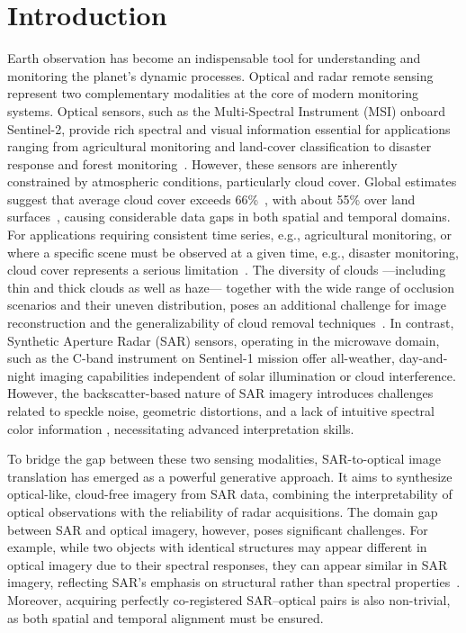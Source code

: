 \documentclass[remotesensing,article,submit,pdftex,moreauthors]{Definitions/mdpi}
\begin{document}
\section{Introduction}
Earth observation has become an indispensable tool for understanding and monitoring the planet's dynamic processes. Optical and radar remote sensing represent two complementary modalities at the core of modern monitoring systems. Optical sensors, such as the Multi-Spectral Instrument (MSI) onboard Sentinel-2, provide rich spectral and visual information essential for applications ranging from agricultural monitoring and land-cover classification to disaster response and forest monitoring~\cite{S2MS_GAN}. However, these sensors are inherently constrained by atmospheric conditions, particularly cloud cover. Global estimates suggest that average cloud cover exceeds 66\%~\cite{dl_cloud_detection_survey,A_cGAN_fuse_sar_MS_CR,CR_SEN2_dRNN}, with about 55\% over land surfaces~\cite{CR_SEN2_dRNN}, causing considerable data gaps in both spatial and temporal domains. For applications requiring consistent time series, e.g., agricultural monitoring, or where a specific scene must be observed at a given time, e.g., disaster monitoring, cloud cover represents a serious limitation~\cite{CR_SEN2_dRNN}. The diversity of clouds —including thin and thick clouds as well as haze— together with the wide range of occlusion scenarios and their uneven distribution, poses an additional challenge for image reconstruction and the generalizability of cloud removal techniques~\cite{CR_Advances_Review_ORS}. In contrast, Synthetic Aperture Radar (SAR) sensors, operating in the microwave domain, such as the C-band instrument on Sentinel-1 mission offer all-weather, day-and-night imaging capabilities independent of solar illumination or cloud interference. However, the backscatter-based nature of SAR imagery introduces challenges related to speckle noise, geometric distortions, and a lack of intuitive spectral color information \cite{bench_sar_color, CR_RS_GAN_s2o}, necessitating advanced interpretation skills.

To bridge the gap between these two sensing modalities, SAR-to-optical image translation has emerged as a powerful generative approach. It aims to synthesize optical-like, cloud-free imagery from SAR data, combining the interpretability of optical observations with the reliability of radar acquisitions. The domain gap between SAR and optical imagery, however, poses significant challenges. For example, while two objects with identical structures may appear different in optical imagery due to their spectral responses, they can appear similar in SAR imagery, reflecting SAR’s emphasis on structural rather than spectral properties~\cite{RS_Data_Fusion_GANs_sota}. Moreover, acquiring perfectly co-registered SAR–optical pairs is also non-trivial, as both spatial and temporal alignment must be ensured. 
\end{document}
